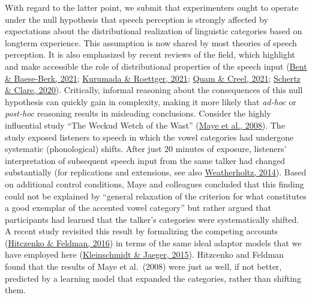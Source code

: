 \documentclass[
  11pt,
  english,
  man,floatsintext]{apa6}
\begin{document}
With regard to the latter point, we submit that experimenters ought to operate under the null hypothesis that speech perception is strongly affected by expectations about the distributional realization of linguistic categories based on longterm experience. This assumption is now shared by most theories of speech perception. It is also emphasized by recent reviews of the field, which highlight and make accessible the role of distributional properties of the speech input (\protect\hyperlink{ref-bent-baeseberk2021}{Bent \& Baese-Berk, 2021}; \protect\hyperlink{ref-kurumada-roettger2021}{Kurumada \& Roettger, 2021}; \protect\hyperlink{ref-quam-creel2021}{Quam \& Creel, 2021}; \protect\hyperlink{ref-schertz-clare2020}{Schertz \& Clare, 2020}). Critically, informal reasoning about the consequences of this null hypothesis can quickly gain in complexity, making it more likely that \emph{ad-hoc} or \emph{post-hoc} reasoning results in misleading conclusions. Consider the highly influential study ``The Weckud Wetch of the Wast'' (\protect\hyperlink{ref-maye2008}{Maye et al., 2008}). The study exposed listeners to speech in which the vowel categories had undergone systematic (phonological) shifts. After just 20 minutes of exposure, listeners' interpretation of subsequent speech input from the same talker had changed substantially (for replications and extensions, see also \protect\hyperlink{ref-weatherholtz2014}{Weatherholtz, 2014}). Based on additional control conditions, Maye and colleagues concluded that this finding could not be explained by ``general relaxation of the criterion for what constitutes a good exemplar of the accented vowel category'' but rather argued that participants had learned that the talker's categories were systematically shifted. A recent study revisited this result by formalizing the competing accounts (\protect\hyperlink{ref-hitczenko-feldman2016}{Hitczenko \& Feldman, 2016}) in terms of the same ideal adaptor models that we have employed here (\protect\hyperlink{ref-kleinschmidt-jaeger2015}{Kleinschmidt \& Jaeger, 2015}). Hitzcenko and Feldman found that the results of Maye et al.~(2008) were just as well, if not better, predicted by a learning model that expanded the categories, rather than shifting them.
\end{document}
